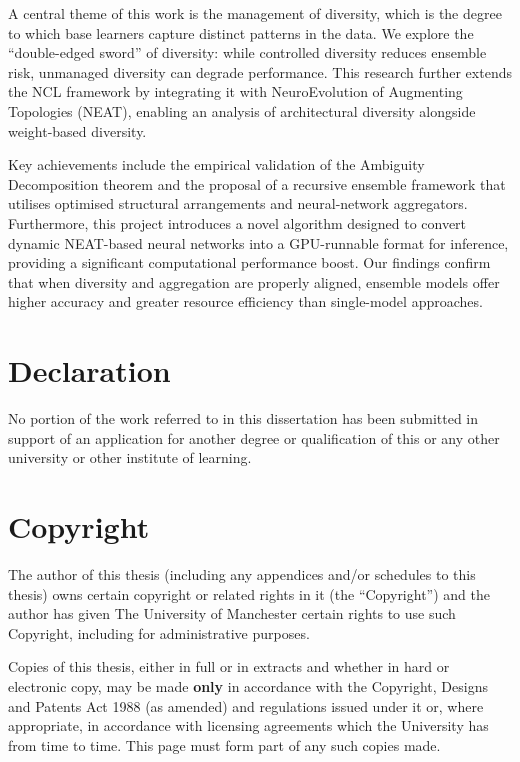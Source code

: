 \documentclass{article}
\begin{document}
A central theme of this work is the management of diversity, which is the degree to which base learners capture distinct patterns in the data. We explore the ``double-edged sword'' of diversity: while controlled diversity reduces ensemble risk, unmanaged diversity can degrade performance. This research further extends the NCL framework by integrating it with NeuroEvolution of Augmenting Topologies (NEAT), enabling an analysis of architectural diversity alongside weight-based diversity. 

Key achievements include the empirical validation of the Ambiguity Decomposition theorem and the proposal of a recursive ensemble framework that utilises optimised structural arrangements and neural-network aggregators. Furthermore, this project introduces a novel algorithm designed to convert dynamic NEAT-based neural networks into a GPU-runnable format for inference, providing a significant computational performance boost. Our findings confirm that when diversity and aggregation are properly aligned, ensemble models offer higher accuracy and greater resource efficiency than single-model approaches. 


\newpage
\section*{Declaration}
No portion of the work referred to in this dissertation has
been submitted in support of an application for another
degree or qualification of this or any other university or
other institute of learning. 


\section*{Copyright}
The author of this thesis (including any appendices and/or schedules to this thesis) owns certain copyright or related rights in it (the ``Copyright'') and the author has given The University of Manchester certain rights to use such Copyright, including for administrative purposes. 

Copies of this thesis, either in full or in extracts and whether in hard or electronic copy, may be made \textbf{only} in accordance with the Copyright, Designs and Patents Act 1988 (as amended) and regulations issued under it or, where appropriate, in accordance with licensing agreements which the University has from time to time. This page must form part of any such copies made. 
\end{document}
